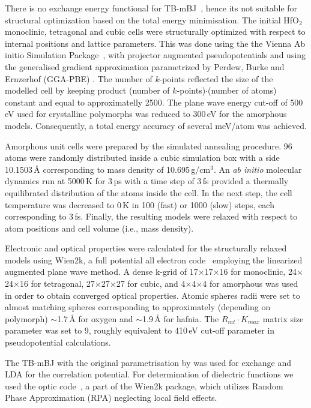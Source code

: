 \documentclass[10pt,a4paper,twocolumn]{article}
\begin{document}
There is no exchange energy functional for TB-mBJ~\cite{Tran2009}, hence its not suitable for structural optimization based on the total energy minimisation.
The initial HfO$_2$ monoclinic, tetragonal and cubic cells were structurally optimized with respect to internal positions and lattice parameters.
This was done using the the Vienna Ab initio Simulation Package~\cite{Kresse1996}, with projector augmented pseudopotentials \cite{Kresse1999} and using the generalised gradient approximation parametrized by Perdew, Burke and Ernzerhof (GGA-PBE) \cite{Perdew1996}.
The number of $k$-points reflected the size of the modelled cell by keeping product (number of $k$-points)$\cdot$(number of atoms) constant and equal to approximatelly 2500.
The plane wave energy cut-off of 500\,eV used for crystalline polymorphs was reduced to 300\,eV for the amorphous models.
Consequently, a total energy accuracy of several meV/atom was achieved.

Amorphous unit cells were prepared by the simulated annealing procedure.
96 atoms were randomly distributed inside a cubic simulation box with a side 10.1503\,\AA{} corresponding to mass density of 10.695\,g/cm$^3$.
An \textit{ab initio} molecular dynamics run at 5000\,K for 3\,ps with a time step of 3\,fs provided a thermally equilibrated distribution of the atoms inside the cell.
In the next step, the cell temperature was decreased to 0\,K in 100 (fast) or 1000 (slow) steps, each corresponding to 3\,fs.
Finally, the resulting models were relaxed with respect to atom positions and cell volume (i.e., mass density).

Electronic and optical properties were calculated for the structurally relaxed models using Wien2k, a full potential all electron code~\cite{Blaha2001} employing the linearized augmented plane wave method.
A dense k-grid of 17$\times$17$\times$16 for monoclinic, 24$\times$24$\times$16 for tetragonal, 27$\times$27$\times$27 for cubic, and 4$\times$4$\times$4 for amorphous was used in order to obtain converged optical properties.
Atomic spheres radii were set to almost matching spheres corresponding to approximately (depending on polymorph) $\sim$1.7\,\AA{} for oxygen and $\sim$1.9\,\AA{} for hafnia.
The $R_{mt} \cdot K_{max}$ matrix size parameter was set to 9, roughly equivalent to 410\,eV cut-off parameter in pseudopotential calculations.

The TB-mBJ with the original parametrisation by \citet{Tran2009} was used for exchange and LDA for the correlation potential. For determination of dielectric functions we used the optic code~\cite{AmbroschDraxl2006}, a part of the Wien2k package, which utilizes Random Phase Approximation (RPA) neglecting local field effects.
\end{document}
